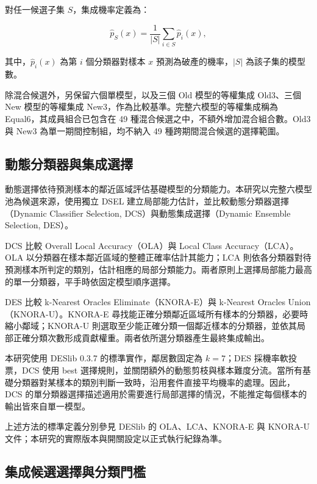 對任一候選子集 \(S\)，集成機率定義為：

\begin{equation}\label{eq:method-probability}
\hat p_S(x)=\frac{1}{|S|}\sum_{i\in S}\hat p_i(x),
\end{equation}

其中，\(\hat p_i(x)\) 為第 \(i\) 個分類器對樣本 \(x\) 預測為破產的機率，\(|S|\) 為該子集的模型數。

除混合候選外，另保留六個單模型，以及三個 Old 模型的等權集成 Old3、三個 New 模型的等權集成 New3，作為比較基準。完整六模型的等權集成稱為 Equal6，其成員組合已包含在 49 種混合候選之中，不額外增加混合組合數。Old3 與 New3 為單一期間控制組，均不納入 49 種跨期間混合候選的選擇範圍。

\subsection{動態分類器與集成選擇}

動態選擇依待預測樣本的鄰近區域評估基礎模型的分類能力。本研究以完整六模型池為候選來源，使用獨立 DSEL 建立局部能力估計，並比較動態分類器選擇（Dynamic Classifier Selection, DCS）與動態集成選擇（Dynamic Ensemble Selection, DES）。

DCS 比較 Overall Local Accuracy（OLA）與 Local Class Accuracy（LCA）。OLA 以分類器在樣本鄰近區域的整體正確率估計其能力；LCA 則依各分類器對待預測樣本所判定的類別，估計相應的局部分類能力。兩者原則上選擇局部能力最高的單一分類器，平手時依固定模型順序選擇。

DES 比較 k-Nearest Oracles Eliminate（KNORA-E）與 k-Nearest Oracles Union（KNORA-U）。KNORA-E 尋找能正確分類鄰近區域所有樣本的分類器，必要時縮小鄰域；KNORA-U 則選取至少能正確分類一個鄰近樣本的分類器，並依其局部正確分類次數形成貢獻權重。兩者依所選分類器產生最終集成輸出。

本研究使用 DESlib 0.3.7 的標準實作，鄰居數固定為 \(k=7\)；DES 採機率軟投票，DCS 使用 {\normalfont best} 選擇規則，並關閉額外的動態剪枝與樣本難度分流。當所有基礎分類器對某樣本的類別判斷一致時，沿用套件直接平均機率的處理。因此，DCS 的單分類器選擇描述適用於需要進行局部選擇的情況，不能推定每個樣本的輸出皆來自單一模型。

上述方法的標準定義分別參見 DESlib 的 OLA\autocite{deslib-ola-docs}、LCA\autocite{deslib-lca-docs}、KNORA-E\autocite{deslib-knorae-docs} 與 KNORA-U\autocite{deslib-knorau-docs} 文件；本研究的實際版本與開關設定以正式執行紀錄為準。

\subsection{集成候選選擇與分類門檻}

